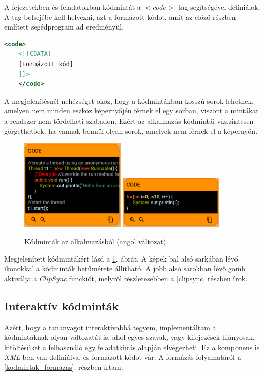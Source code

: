 \documentclass[12pt,a4paper]{article}
\newcommand{\xml}{\textit{XML}\xspace}
\begin{document}
	A fejezetekben és feladatokban kódmintát a $<code>$ tag segítségével definiálok. A tag belsejébe kell helyezni, azt a formázott kódot, amit az előző részben említett segédprogram ad eredményül.
	
	\bigskip
	\begin{lstlisting}[language=XML]
	<code>
	<![CDATA[
	[Formázott kód]
	]]>
	</code>	
	\end{lstlisting}
	\bigskip
	
	A megjelenítésnél nehézséget okoz, hogy a kódmintákban kosszú sorok lehetnek, amelyen nem minden eszköz képernyőjén férnek el egy sorban, viszont a mintákat a rendszer nem tördelheti szabadon. Ezért az alkalmazás kódmintái vízszintesen görgethetőek, ha vannak bennül olyan sorok, amelyek nem férnek el a képernyőn.
	
	\begin{figure}
		\centering
		\includegraphics[width=5cm]{code_component_1}
		\includegraphics[width=5cm]{code_component_2}
		\caption{Kódminták az alkalmazásból (angol változat).}
		\label{code_component_figure}
	\end{figure}
	
	Megjelenített kódmintákért lásd a \ref{code_component_figure}. ábrát. A képek bal alsó sarkában lévő ikonokkal a kódminták betűmérete állítható. A jobb alsó sarokban lévő gomb aktiválja a \textit{ClipSync} funckiót, melyről részletesebben a \ref{clipsync} részben írok.
	
	\subsection{Interaktív kódminták}\label{interaktiv_kodmintak}
	
	Azért, hogy a tananyagot interaktívabbá tegyem, implementáltam a kódmintáknak olyan változatát is, ahol egyes szavak, vagy kifejezések hiányosak, kitöltésüket a felhasználó egy feladatkiírás alapján elvégezheti. Ez a komponens is \xml-ben van definiálva, és formázott kódot vár. A formázás folyamatáról a \ref{kodmintak_formazas}. részben írtam.
	
\end{document}
